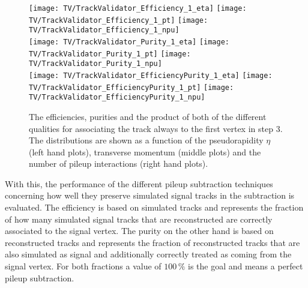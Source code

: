 \begin{figure}[Ht]
    \centering
    \texttt{[image: TV/TrackValidator\_Efficiency\_1\_eta]}
    \texttt{[image: TV/TrackValidator\_Efficiency\_1\_pt]}
    \texttt{[image: TV/TrackValidator\_Efficiency\_1\_npu]}
    \\
    \texttt{[image: TV/TrackValidator\_Purity\_1\_eta]}
    \texttt{[image: TV/TrackValidator\_Purity\_1\_pt]}
    \texttt{[image: TV/TrackValidator\_Purity\_1\_npu]}
    \\
    \texttt{[image: TV/TrackValidator\_EfficiencyPurity\_1\_eta]}
    \texttt{[image: TV/TrackValidator\_EfficiencyPurity\_1\_pt]}
    \texttt{[image: TV/TrackValidator\_EfficiencyPurity\_1\_npu]}
    \caption[Efficiencies, purities and their product of the different qualities of the association map with associating the track always to the first vertex in step 3]{The efficiencies, purities and the product of both of the different qualities for associating the track always to the first vertex in step 3. The distributions are shown as a function of the pseudorapidity $\eta$ (left hand plots), transverse momentum (middle plots) and the number of pileup interactions (right hand plots). \label{plot:TASEFRDQ1Signal}}
\end{figure}

With this, the performance of the different pileup subtraction techniques concerning how well they preserve simulated signal tracks in the subtraction is evaluated. The efficiency is based on simulated tracks and represents the fraction of how many simulated signal tracks that are reconstructed are correctly associated to the signal vertex. The purity on the other hand is based on reconstructed tracks and represents the fraction of reconstructed tracks that are also simulated as signal and additionally correctly treated as coming from the signal vertex. For both fractions a value of $100\,\%$ is the goal and means a perfect pileup subtraction.

